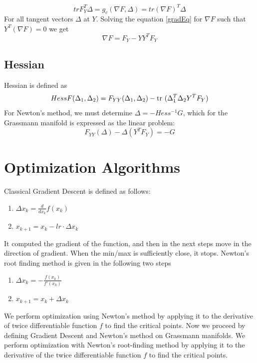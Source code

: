 \documentclass[11pt,a4paper]{report}
\begin{document}
\begin{equation}\label{gradEq}
    tr F_Y^{T} \Delta = g_c (\nabla F, \Delta) = tr(\nabla F)^T \Delta
\end{equation}
For all tangent vectors $\Delta$ at $Y$. \newline
Solving the equation \ref{gradEq} for $\nabla F$ such that $Y^T(\nabla F) = 0$ we get
\begin{equation}
    \nabla F = F_Y - Y Y^T F_Y
\end{equation}
\section{Hessian}
Hessian is defined as
$$ Hess F(\Delta_1, \Delta_2) = F_{YY}(\Delta_1, \Delta_2) - \textrm{tr }(\Delta_1^T \Delta_2 Y^T F_Y) $$
For Newton's method, we must determine $\Delta = -Hess^{-1}G$, which for the Grassmann manifold is expressed as the linear problem:
$$ F_{YY}(\Delta) - \Delta(Y^T F_{Y}) = -G $$
\chapter{Optimization Algorithms}\label{OptChapter}
Classical Gradient Descent is defined as follows: 
\begin{enumerate}
\item $\Delta x_k = \frac{d}{d x_k} f(x_k) $
\item $x_{k+1} = x_{k} - lr \cdot \Delta x_k$
\end{enumerate}
It computed the gradient of the function, and then in the next steps move in the direction of gradient.
When the min/max is sufficiently close, it stops.
\newline
Newton's root finding method is given in the following two steps
\begin{enumerate}
    \item $\Delta x_k = - \frac{f(x_k)}{f'(x_k)}$
    \item $x_{k+1} = x_k + \Delta x_k$
\end{enumerate}
We perform optimization using Newton's method by applying it to the derivative of twice differentiable function $f$ to find the critical points.
\newline
Now we proceed by defining Gradient Descent and Newton's method on Grassmann manifolds.
We perform optimization with Newton's root-finding method by applying it to the derivative of the twice differentiable function $f$ to find the critical points.
\end{document}

